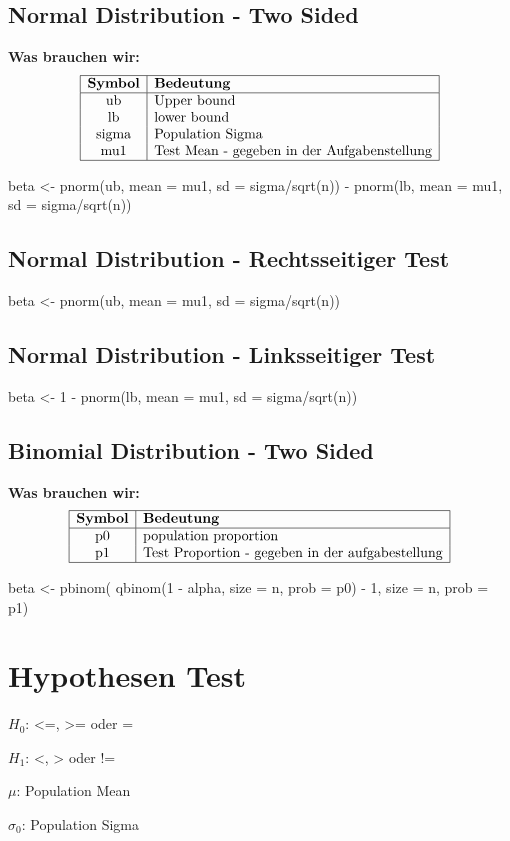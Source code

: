 \subsection{Normal Distribution - Two Sided}
\textbf{Was brauchen wir:}\\
\[
\begin{array}{|c|l|}
\hline
\textbf{Symbol} & \textbf{Bedeutung} \\
\hline
\text{ub} & \text{Upper bound} \\
\text{lb} & \text{lower bound} \\
\text{sigma} & \text{Population Sigma} \\
\text{mu1} & \text{Test Mean - gegeben in der Aufgabenstellung} \\
\hline
\end{array}
\]
\begin{rcode}{1}
beta <- pnorm(ub, mean = mu1, sd = sigma/sqrt(n)) - pnorm(lb, mean = mu1, sd = sigma/sqrt(n))
\end{rcode}
\subsection{Normal Distribution - Rechtsseitiger Test}
\begin{rcode}{1}
beta <- pnorm(ub, mean = mu1, sd = sigma/sqrt(n))
\end{rcode}
\subsection{Normal Distribution - Linksseitiger Test}
\begin{rcode}{1}
beta <- 1 - pnorm(lb, mean = mu1, sd = sigma/sqrt(n))
\end{rcode}
\columnbreak

\subsection{Binomial Distribution - Two Sided}
\textbf{Was brauchen wir:}
\[
\begin{array}{|c|l|}
\hline
\textbf{Symbol} & \textbf{Bedeutung} \\
\hline
\text{p0} & \text{population proportion}\\
\text{p1} & \text{Test Proportion - gegeben in der aufgabestellung} \\
\hline
\end{array}
\]
\begin{rcode}{1}
beta <- pbinom(                                       qbinom(1 - alpha, size = n, prob = p0) - 1,               size = n, prob = p1)
\end{rcode}

\section{Hypothesen Test}
$H_0$: <=, >= oder =

$H_1$: <, > oder !=

$\mu$: Population Mean

 $\sigma_0$: Population Sigma

 

\newpage
















